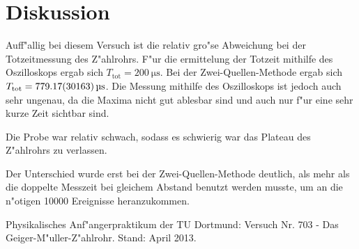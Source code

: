 \section{Diskussion}
	\label{diskussion}

	Auff"allig bei diesem Versuch ist die relativ gro"se Abweichung bei der Totzeitmessung des Z"ahlrohrs. F"ur die ermittelung der Totzeit mithilfe des Oszilloskops ergab sich $T_\mathrm{tot} = \SI{200}{\micro\second}$. Bei der Zwei-Quellen-Methode ergab sich $T_\mathrm{tot} = \SI{779.17 (30163)}{\micro\second}$.  
	Die Messung mithilfe des Oszilloskops ist jedoch auch sehr ungenau, da die Maxima nicht gut ablesbar sind und auch nur f"ur eine sehr kurze Zeit sichtbar sind.

	Die Probe war relativ schwach, sodass es schwierig war das Plateau des Z"ahlrohrs zu verlassen.

	Der Unterschied wurde erst bei der Zwei-Quellen-Methode deutlich, als mehr als die doppelte Messzeit bei gleichem Abstand benutzt werden musste, um an die n"otigen 10000 Ereignisse heranzukommen.

	

\begin{thebibliography}{9}
	 Physikalisches Anf"angerpraktikum der TU Dortmund: Versuch Nr. 703 - Das Geiger-M"uller-Z"ahlrohr. Stand: April 2013.
\end{thebibliography}
